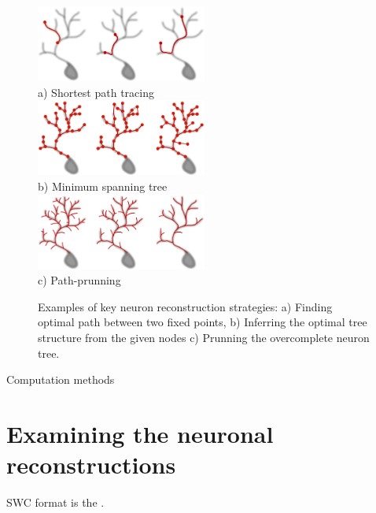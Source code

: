 \begin{figure}
\begin{center}
\includegraphics[width=0.5\textwidth]{ch1_fig2}\\
a) Shortest path tracing \\
\includegraphics[width=0.5\textwidth]{ch1_fig3}\\
b) Minimum spanning tree \\
\includegraphics[width=0.5\textwidth]{ch1_fig4}\\
c) Path-prunning
\end{center}
\vspace{-3ex}
\caption{Examples of key neuron reconstruction strategies: a) Finding optimal path between two fixed points, b) Inferring the  optimal tree structure from the given nodes c) Prunning the overcomplete neuron tree.}
\vspace{-1ex}
\label{ch1__fig2-4}
\end{figure}

Computation methods

\section{Examining the neuronal reconstructions}
SWC format is the .

